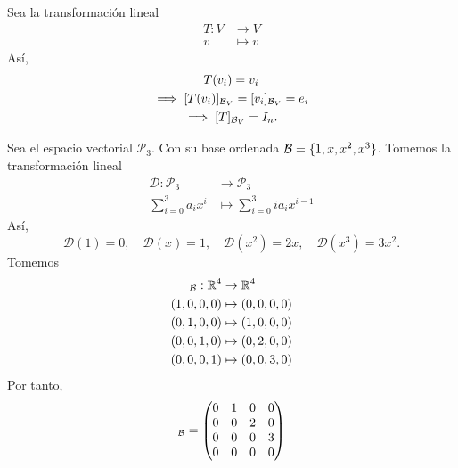 \documentclass[12pt,a4paper]{book}
\newcommand{\llaves}[1]{\{#1\}}
\begin{document}
    \begin{ejemplo}
    \label{ej:32}
        Sea la transformación lineal
        \begin{align*}
            T : V & \to V\\
            v & \mapsto v
        \end{align*}
        Así,
        \begin{gather*}
            T(v_{i}) = v_{i}\\
            \implies [T(v_{i})]_{\mathcal{B}_{V}} = [v_{i}]_{\mathcal{B}_{V}} = e_{i}\\
            \implies [T]_{\mathcal{B}_{V}} = I_{n}.
        \end{gather*}
    \end{ejemplo}

    \begin{ejemplo}
    \label{ej:33}
        Sea el espacio vectorial $\mathcal{P}_{3}$. Con su base ordenada $\BB = \llaves{1, x, x^{2}, x^{3}}$. Tomemos la transformación lineal
        \begin{align*}
            \mathcal{D} : \mathcal{P}_{3} & \to \mathcal{P}_{3}\\
            \sum_{i = 0}^{3}a_{i}x^{i} & \mapsto \sum_{i = 0}^{3}ia_{i}x^{i - 1}
        \end{align*}
        Así,
        \begin{equation*}
            \mathcal{D}(1) = 0, \quad \mathcal{D}(x) = 1, \quad \mathcal{D}(x^{2}) = 2x, \quad \mathcal{D}(x^{3}) = 3x^{2}.
        \end{equation*}
        Tomemos
        \begin{align*}
            [\mathcal{D}]_{\BB}: \R^{4} & \to \R^{4}\\
            (1, 0, 0, 0) & \mapsto (0, 0, 0, 0)\\
            (0, 1, 0, 0) & \mapsto (1, 0, 0, 0)\\
            (0, 0, 1, 0) & \mapsto (0, 2, 0, 0)\\
            (0, 0, 0, 1) & \mapsto (0, 0, 3, 0)\\
        \end{align*}
        Por tanto,
        \begin{equation*}
            [\mathcal{D}]_{\BB} = 
            \begin{pmatrix}
                0 & 1 & 0 & 0\\
                0 & 0 & 2 & 0\\
                0 & 0 & 0 & 3\\
                0 & 0 & 0 & 0

\end{pmatrix}
\end{equation*}
\end{ejemplo}
\end{document}
